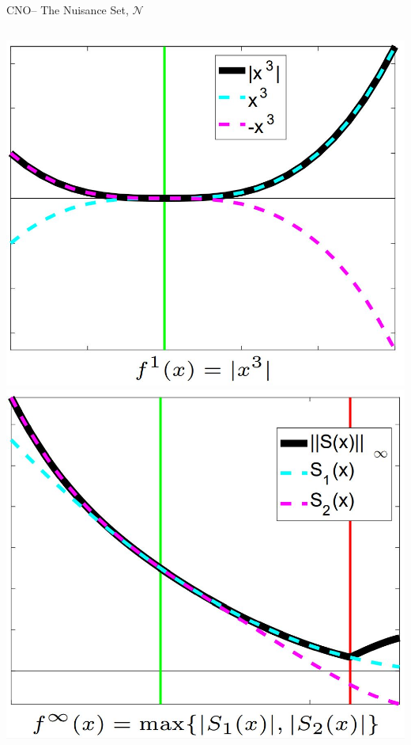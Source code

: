 \documentclass[handout,aspectratio=54]{beamer}
\numberwithin{theorem}{section}
\begin{document}
\begin{frame}{CNO– The Nuisance Set,  $\mathcal{N}$}
\begin{columns}
\includegraphics[width=\textwidth]{fig/52-1.jpg}
\includegraphics[width=\textwidth]{fig/52-2.jpg}
\end{columns}
\end{frame}
\end{document}
